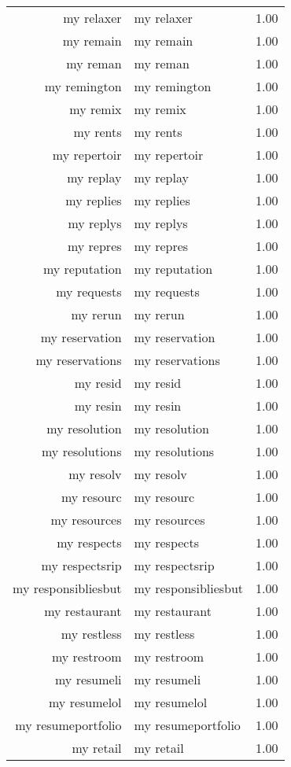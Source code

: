 \begin{table}[ht]
\begin{tabular}{rlr}
  my relaxer & my relaxer & 1.00 \\ 
  my remain & my remain & 1.00 \\ 
  my reman & my reman & 1.00 \\ 
  my remington & my remington & 1.00 \\ 
  my remix & my remix & 1.00 \\ 
  my rents & my rents & 1.00 \\ 
  my repertoir & my repertoir & 1.00 \\ 
  my replay & my replay & 1.00 \\ 
  my replies & my replies & 1.00 \\ 
  my replys & my replys & 1.00 \\ 
  my repres & my repres & 1.00 \\ 
  my reputation & my reputation & 1.00 \\ 
  my requests & my requests & 1.00 \\ 
  my rerun & my rerun & 1.00 \\ 
  my reservation & my reservation & 1.00 \\ 
  my reservations & my reservations & 1.00 \\ 
  my resid & my resid & 1.00 \\ 
  my resin & my resin & 1.00 \\ 
  my resolution & my resolution & 1.00 \\ 
  my resolutions & my resolutions & 1.00 \\ 
  my resolv & my resolv & 1.00 \\ 
  my resourc & my resourc & 1.00 \\ 
  my resources & my resources & 1.00 \\ 
  my respects & my respects & 1.00 \\ 
  my respectsrip & my respectsrip & 1.00 \\ 
  my responsibliesbut & my responsibliesbut & 1.00 \\ 
  my restaurant & my restaurant & 1.00 \\ 
  my restless & my restless & 1.00 \\ 
  my restroom & my restroom & 1.00 \\ 
  my resumeli & my resumeli & 1.00 \\ 
  my resumelol & my resumelol & 1.00 \\ 
  my resumeportfolio & my resumeportfolio & 1.00 \\ 
  my retail & my retail & 1.00 \\ 

\end{tabular}
\end{table}

